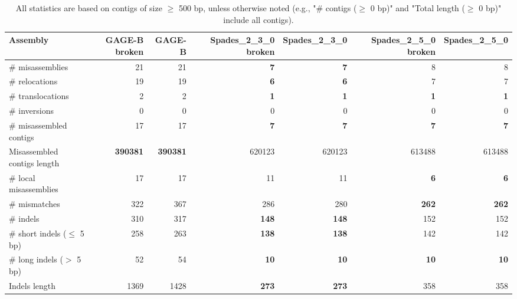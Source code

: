 \documentclass[12pt,a4paper]{article}
\begin{document}
\begin{table}[ht]
\begin{center}
\caption{All statistics are based on contigs of size $\geq$ 500 bp, unless otherwise noted (e.g., "\# contigs ($\geq$ 0 bp)" and "Total length ($\geq$ 0 bp)" include all contigs).}
\begin{tabular}{|l*{6}{|r}|}
\hline
Assembly & GAGE-B broken & GAGE-B & Spades\_2\_3\_0 broken & Spades\_2\_3\_0 & Spades\_2\_5\_0 broken & Spades\_2\_5\_0 \\ \hline
\# misassemblies & 21 & 21 & {\bf 7} & {\bf 7} & 8 & 8 \\ \hline
\hspace{5mm}\# relocations & 19 & 19 & {\bf 6} & {\bf 6} & 7 & 7 \\ \hline
\hspace{5mm}\# translocations & 2 & 2 & {\bf 1} & {\bf 1} & {\bf 1} & {\bf 1} \\ \hline
\hspace{5mm}\# inversions & 0 & 0 & 0 & 0 & 0 & 0 \\ \hline
\# misassembled contigs & 17 & 17 & {\bf 7} & {\bf 7} & {\bf 7} & {\bf 7} \\ \hline
Misassembled contigs length & {\bf 390381} & {\bf 390381} & 620123 & 620123 & 613488 & 613488 \\ \hline
\# local misassemblies & 17 & 17 & 11 & 11 & {\bf 6} & {\bf 6} \\ \hline
\# mismatches & 322 & 367 & 286 & 280 & {\bf 262} & {\bf 262} \\ \hline
\# indels & 310 & 317 & {\bf 148} & {\bf 148} & 152 & 152 \\ \hline
\hspace{5mm}\# short indels ($\leq$ 5 bp) & 258 & 263 & {\bf 138} & {\bf 138} & 142 & 142 \\ \hline
\hspace{5mm}\# long indels ($>$ 5 bp) & 52 & 54 & {\bf 10} & {\bf 10} & {\bf 10} & {\bf 10} \\ \hline
Indels length & 1369 & 1428 & {\bf 273} & {\bf 273} & 358 & 358 \\ \hline
\end{tabular}
\end{center}
\end{table}
\end{document}
